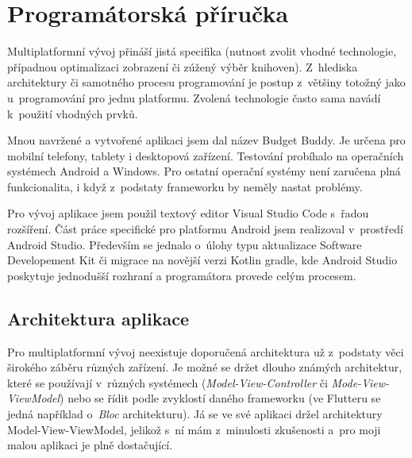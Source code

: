 \documentclass[
  biblatex,
  figures=true,
  tables=false,
  glossaries,
  index
]{kidiplom}
\begin{document}
\section{Programátorská příručka}

Multiplatformní vývoj přináší jistá specifika (nutnost zvolit vhodné technologie, případnou optimalizaci zobrazení či zúžený výběr knihoven). Z~hlediska architektury či samotného procesu programování je postup z~většiny totožný jako u~programování pro jednu platformu. Zvolená technologie často sama navádí k~použití vhodných prvků.

Mnou navržené a vytvořené aplikaci jsem dal název Budget Buddy. Je určena pro mobilní telefony, tablety i desktopová zařízení. Testování probíhalo na operačních systémech Android a Windows. Pro ostatní operační systémy není zaručena plná funkcionalita, i když z~podstaty frameworku by neměly nastat problémy.

Pro vývoj aplikace jsem použil textový editor Visual Studio Code s~řadou rozšíření. Část práce specifické pro platformu Android jsem realizoval v~prostředí Android Studio. Především se jednalo o~úlohy typu aktualizace Software Developement Kit či migrace na novější verzi Kotlin gradle, kde Android Studio poskytuje jednodušší rozhraní a programátora provede celým procesem.

\subsection{Architektura aplikace}
Pro multiplatformní vývoj neexistuje doporučená architektura už z~podstaty věci širokého záběru různých zařízení. Je možné se držet dlouho známých architektur, které se používají v~různých systémech (\textit{Model-View-Controller} či \textit{Mode-View-ViewModel}) nebo se řídit podle zvyklostí daného frameworku (ve Flutteru se jedná například o~\textit{Bloc} \cite{bloc} architekturu). Já se ve své aplikaci držel architektury Model-View-ViewModel, jelikož s~ní mám z~minulosti zkušenosti a~pro moji malou aplikaci je plně dostačující. 
\end{document}
